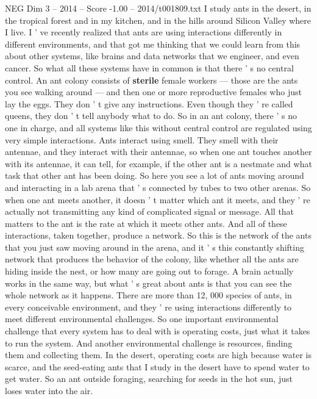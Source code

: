 \begin{textsample}{NEG Dim 3 – 2014 – Score -1.00 – 2014/t001809.txt}  \label{ex:f3_neg_046}
I study ants in the desert, in the tropical forest and in my kitchen, and in the hills around Silicon Valley where I live.
I ' ve recently realized that ants are using interactions differently in different environments, and that got me thinking that we could learn from this about other systems, like brains and data networks that we engineer, and even cancer.
So what all these systems have in common is that there ' s no central control.
An ant colony consists of \textbf{sterile} female workers — those are the ants you see walking around — and then one or more reproductive females who just lay the eggs.
They don ' t give any instructions.
Even though they ' re called queens, they don ' t tell anybody what to do.
So in an ant colony, there ' s no one in charge, and all systems like this without central control are regulated using very simple interactions.
Ants interact using smell.
They smell with their antennae, and they interact with their antennae, so when one ant touches another with its antennae, it can tell, for example, if the other ant is a nestmate and what task that other ant has been doing.
So here you see a lot of ants moving around and interacting in a lab arena that ' s connected by tubes to two other arenas.
So when one ant meets another, it doesn ' t matter which ant it meets, and they ' re actually not transmitting any kind of complicated signal or message.
All that matters to the ant is the rate at which it meets other ants.
And all of these interactions, taken together, produce a network.
So this is the network of the ants that you just saw moving around in the arena, and it ' s this constantly shifting network that produces the behavior of the colony, like whether all the ants are hiding inside the nest, or how many are going out to forage.
A brain actually works in the same way, but what ' s great about ants is that you can see the whole network as it happens.
There are more than 12, 000 species of ants, in every conceivable environment, and they ' re using interactions differently to meet different environmental challenges.
So one important environmental challenge that every system has to deal with is operating costs, just what it takes to run the system.
And another environmental challenge is resources, finding them and collecting them.
In the desert, operating costs are high because water is scarce, and the seed-eating ants that I study in the desert have to spend water to get water.
So an ant outside foraging, searching for seeds in the hot sun, just loses water into the air.

\end{textsample}
